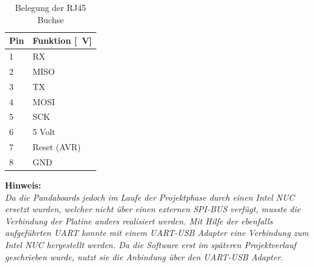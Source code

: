 \begin{table}[H]
  \centering
  \begin{tabularx}{\textwidth}{|l|X|}
    \hline
     Pin & Funktion [\SI{}{\V}]  \\ \hline \hline
     1 & RX \\ \hline
     2 & MISO \\ \hline
     3 & TX \\ \hline
     4 & MOSI \\ \hline
     5 & SCK \\ \hline
     6 & 5 Volt \\ \hline
     7 & Reset (AVR) \\ \hline
     8 & GND \\ \hline
  \end{tabularx}
  \caption{Belegung der RJ45 Buchse}%
  \label{tab:rj45}
\end{table}

\begin{minipage}{0.9\textwidth}
\textbf{Hinweis:\\}
\emph{Da die Pandaboards jedoch im Laufe der Projektphase durch einen Intel NUC ersetzt wurden, welcher nicht über einen externen SPI-BUS verfügt, musste die Verbindung der Platine anders realisiert werden. 
Mit Hilfe der ebenfalls aufgeführten UART konnte mit einem UART-USB Adapter eine
Verbindung zum Intel NUC hergestellt werden. Da die Software erst im späteren Projektverlauf geschrieben wurde, nutzt sie die Anbindung über 
den UART-USB Adapter.}
\end{minipage}

